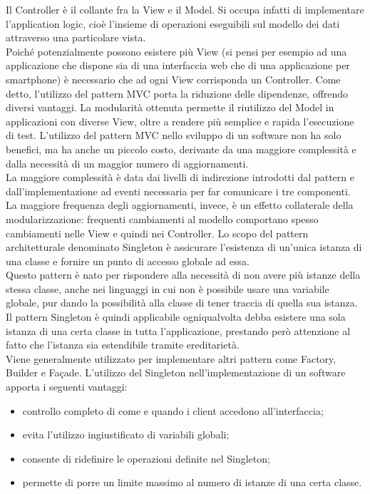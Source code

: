 				Il Controller è il collante fra la View e il Model. Si occupa infatti di implementare l'application logic, cioè l'insieme di operazioni eseguibili sul modello dei dati attraverso una particolare vista.\\
				Poiché potenzialmente possono esistere più View (si pensi per esempio ad una applicazione che dispone sia di una interfaccia web che di una applicazione per smartphone) è necessario che ad ogni View corrisponda un Controller.
			Come detto, l'utilizzo del pattern MVC porta la riduzione delle dipendenze, offrendo diversi vantaggi. La modularità ottenuta permette il riutilizzo del Model in applicazioni con diverse View, oltre a rendere più semplice e rapida l'esecuzione di test. 
			L'utilizzo del pattern MVC nello sviluppo di un software non ha solo benefici, ma ha anche un piccolo costo, derivante da una maggiore complessità e dalla necessità di un maggior numero di aggiornamenti.\\
  			La maggiore complessità è data dai livelli di indirezione introdotti dal pattern e dall'implementazione ad eventi necessaria per far comunicare i tre componenti. La maggiore frequenza degli aggiornamenti, invece, è un effetto collaterale della modularizzazione: frequenti cambiamenti al modello comportano spesso cambiamenti nelle View e quindi nei Controller.
	 \label{app:singleton}
		Lo scopo del pattern architetturale denominato Singleton è 
		assicurare l'esistenza di un'unica istanza di una classe e fornire
		un punto di accesso globale ad essa.\\
		Questo pattern è nato per rispondere alla necessità di non avere più
		istanze della stessa classe, anche nei linguaggi in cui non è possibile 
		usare una variabile globale, pur dando la possibilità alla classe di
		tener traccia di quella sua istanza.\\
		Il pattern Singleton è quindi applicabile ogniqualvolta debba esistere una 
		sola istanza di una certa classe in tutta l'applicazione, prestando però attenzione 
		al fatto che l'istanza sia estendibile tramite ereditarietà.\\
		Viene generalmente utilizzato per implementare altri pattern come Factory, 
		Builder e Façade.
		L'utilizzo del Singleton nell'implementazione di un software apporta i seguenti 
		vantaggi:
		\begin{itemize}
		\item controllo completo di come e quando i client accedono all'interfaccia;
		\item evita l'utilizzo ingiustificato di variabili globali;
		\item consente di ridefinire le operazioni definite nel Singleton;
		\item permette di porre un limite massimo al numero di istanze di una certa classe.
		\end{itemize}
